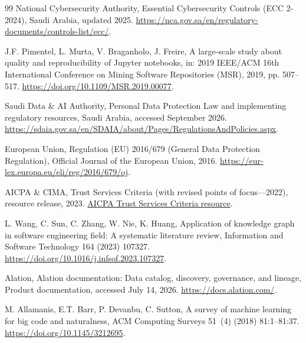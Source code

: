 \documentclass[a4paper,fleqn]{cas-dc}
\begin{document}
\begin{thebibliography}{99}
National Cybersecurity Authority,
\newblock Essential Cybersecurity Controls (ECC 2-2024),
\newblock Saudi Arabia, updated 2025.
\newblock \url{https://nca.gov.sa/en/regulatory-documents/controls-list/ecc/}.

J.F. Pimentel, L. Murta, V. Braganholo, J. Freire,
\newblock A large-scale study about quality and reproducibility of Jupyter notebooks,
\newblock in: 2019 IEEE/ACM 16th International Conference on Mining Software Repositories (MSR), 2019, pp. 507--517.
\newblock \url{https://doi.org/10.1109/MSR.2019.00077}.

Saudi Data \& AI Authority,
\newblock Personal Data Protection Law and implementing regulatory resources,
\newblock Saudi Arabia, accessed September 2026.
\newblock \url{https://sdaia.gov.sa/en/SDAIA/about/Pages/RegulationsAndPolicies.aspx}.

European Union,
\newblock Regulation (EU) 2016/679 (General Data Protection Regulation),
\newblock Official Journal of the European Union, 2016.
\newblock \url{https://eur-lex.europa.eu/eli/reg/2016/679/oj}.

AICPA \& CIMA,
 Trust Services Criteria (with revised points of focus---2022),
\newblock resource release, 2023.
\newblock \href{https://www.aicpa-cima.com/resources/download/2017-trust-services-criteria-with-revised-points-of-focus-2022}{AICPA Trust Services Criteria resource}.

L. Wang, C. Sun, C. Zhang, W. Nie, K. Huang,
\newblock Application of knowledge graph in software engineering field: A systematic literature review,
\newblock Information and Software Technology 164 (2023) 107327.
\newblock \url{https://doi.org/10.1016/j.infsof.2023.107327}.

Alation,
\newblock Alation documentation: Data catalog, discovery, governance, and lineage,
\newblock Product documentation, accessed July 14, 2026.
\newblock \url{https://docs.alation.com/}.

M. Allamanis, E.T. Barr, P. Devanbu, C. Sutton,
\newblock A survey of machine learning for big code and naturalness,
\newblock ACM Computing Surveys 51~(4) (2018) 81:1--81:37.
\newblock \url{https://doi.org/10.1145/3212695}.


\end{thebibliography}
\end{document}
